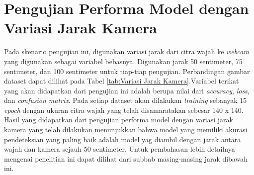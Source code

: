 \section{Pengujian Performa Model dengan Variasi Jarak Kamera}
Pada skenario pengujian ini, digunakan variasi jarak dari citra wajah ke \emph{webcam} yang digunakan sebagai variabel bebasnya. Digunakan jarak 50 sentimeter, 75 sentimeter, dan 100 sentimeter untuk tiap-tiap pengujian. Perbandingan gambar dataset dapat dilihat pada Tabel \ref{tab:Variasi Jarak Kamera}.Variabel terikat yang akan didapatkan dari pengujian ini adalah berupa nilai dari \emph{accuracy}, \emph{loss}, dan \emph{confusion matrix}. Pada setiap dataset akan dilakukan \emph{training} sebanyak 15 \emph{epoch} dengan ukuran citra wajah yang telah disamaratakan sebesar 140 x 140. Hasil yang didapatkan dari pengujian performa model dengan variasi jarak kamera yang telah dilakukan menunjukkan bahwa model yang memiliki akurasi pendeteksian yang paling baik adalah model yag diambil dengan jarak antara wajah dan kamera sejauh 50 sentimeter. Untuk pembahasan lebih detailnya mengenai penelitian ini dapat dilihat dari subbab masing-masing jarak dibawah ini.

